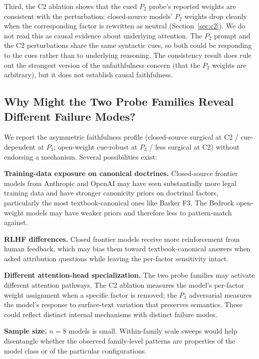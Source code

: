 \documentclass[11pt]{article}
\begin{document}
Third, the C2 ablation shows that the cued $P_2$ probe's reported weights are consistent with the perturbation: closed-source models' $P_2$ weights drop cleanly when the corresponding factor is rewritten as neutral (Section~\ref{sec:c2}). We do not read this as causal evidence about underlying attention. The $P_2$ prompt and the C2 perturbations share the same syntactic cues, so both could be responding to the cues rather than to underlying reasoning. The consistency result does rule out the strongest version of the unfaithfulness concern (that the $P_2$ weights are arbitrary), but it does not establish causal faithfulness.

\subsection{Why Might the Two Probe Families Reveal Different Failure Modes?}

We report the asymmetric faithfulness profile (closed-source surgical at C2 / cue-dependent at $P_3$; open-weight cue-robust at $P_3$ / less surgical at C2) without endorsing a mechanism. Several possibilities exist:

\textbf{Training-data exposure on canonical doctrines.} Closed-source frontier models from Anthropic and OpenAI may have seen substantially more legal training data and have stronger canonicity priors on doctrinal factors, particularly the most textbook-canonical ones like Barker F3. The Bedrock open-weight models may have weaker priors and therefore less to pattern-match against.

\textbf{RLHF differences.} Closed frontier models receive more reinforcement from human feedback, which may bias them toward textbook-canonical answers when asked attribution questions while leaving the per-factor sensitivity intact.

\textbf{Different attention-head specialization.} The two probe families may activate different attention pathways. The C2 ablation measures the model's per-factor weight assignment when a specific factor is removed; the $P_3$ adversarial measures the model's response to surface-text variation that preserves semantics. These could reflect distinct internal mechanisms with distinct failure modes.

\textbf{Sample size.} $n = 8$ models is small. Within-family scale sweeps would help disentangle whether the observed family-level patterns are properties of the model class or of the particular configurations.
\end{document}
